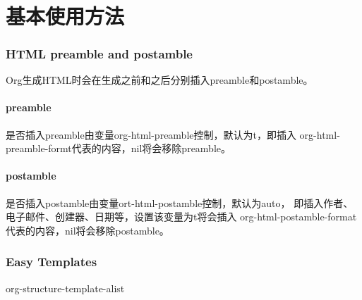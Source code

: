 \documentclass[a4paper,11pt]{article}
\begin{document}
  \tt %
  \pagestyle{header}
  \sybmaketitle
  \tableofcontents
  \newpage

  \pagestyle{main}
  \setcounter{page}{1}

  \part[基本使用方法]{基本使用方法}

  \section[HTML preamble and postamble]{HTML preamble and postamble}
  Org生成HTML时会在生成之前和之后分别插入preamble和postamble。

  \subsection[preamble]{preamble}
  是否插入preamble由变量org-html-preamble控制，默认为t，即插入
  org-html-preamble-formt代表的内容，nil将会移除preamble。

  \subsection[postamble]{postamble}
  是否插入postamble由变量ort-html-postamble控制，默认为auto，
  即插入作者、电子邮件、创建器、日期等，设置该变量为t将会插入
  org-html-postamble-format代表的内容，nil将会移除postamble。


  \section[Easy Templates]{Easy Templates}
  org-structure-template-alist

  
\end{document}

